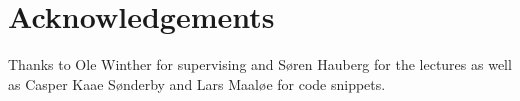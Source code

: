 \section{Acknowledgements}
\label{sec:acknowledgements}

Thanks to Ole Winther for supervising and Søren Hauberg for the lectures as well as Casper Kaae Sønderby and Lars Maaløe for code snippets.

